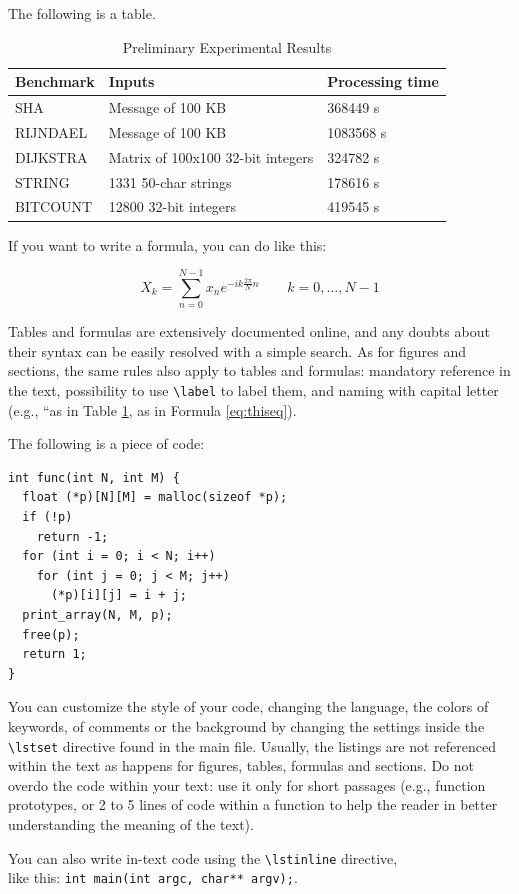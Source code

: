 The following is a table.

\begin{table}
	\centering
	\caption{Preliminary Experimental Results}
	\begin{tabular}{| p{3cm} | p{3cm} | p{3cm} |}
		\hline
		\textbf{Benchmark} & \textbf{Inputs}                   & \textbf{Processing time} \\ \hline
		SHA                & Message of 100 KB                 & 368449 s                 \\ \hline
		RIJNDAEL           & Message of 100 KB                 & 1083568 s                \\ \hline
		DIJKSTRA           & Matrix of 100x100 32-bit integers & 324782 s                 \\ \hline
		STRING             & 1331 50-char strings              & 178616 s                 \\ \hline
		BITCOUNT           & 12800 32-bit integers             & 419545 s                 \\ \hline
		\hline
	\end{tabular}
	\label{tab:ar}
\end{table}

If you want to write a formula, you can do like this:

\begin{equation}\label{eq:thiseq}
	X_{k}=\sum _{n=0}^{N-1}x_{n}e^{-ik{\frac {2\pi }{N}}n}\quad \quad k=0,\dots ,N-1
\end{equation}

Tables and formulas are extensively documented online, and any doubts about their syntax can be easily resolved with a simple search. As for figures and sections, the same rules also apply to tables and formulas: mandatory reference in the text, possibility to use \lstinline{\label} to label them, and naming with capital letter (e.g., ``as in Table \ref{tab:ar}, as in Formula \ref{eq:thiseq}).

The following is a piece of code:

\begin{lstlisting}
int func(int N, int M) {
  float (*p)[N][M] = malloc(sizeof *p);
  if (!p)
    return -1;
  for (int i = 0; i < N; i++)
    for (int j = 0; j < M; j++)
      (*p)[i][j] = i + j;
  print_array(N, M, p);
  free(p);
  return 1;
}
\end{lstlisting}

You can customize the style of your code, changing the language, the colors of keywords, of comments or the background by changing the settings inside the \lstinline{\lstset} directive found in the main file. Usually, the listings are not referenced within the text as happens for figures, tables, formulas and sections. Do not overdo the code within your text: use it only for short passages (e.g., function prototypes, or 2 to 5 lines of code within a function to help the reader in better understanding the meaning of the text).

You can also write in-text code using the \lstinline{\lstinline} directive, \\
like this: \lstinline{int main(int argc, char** argv);}.



